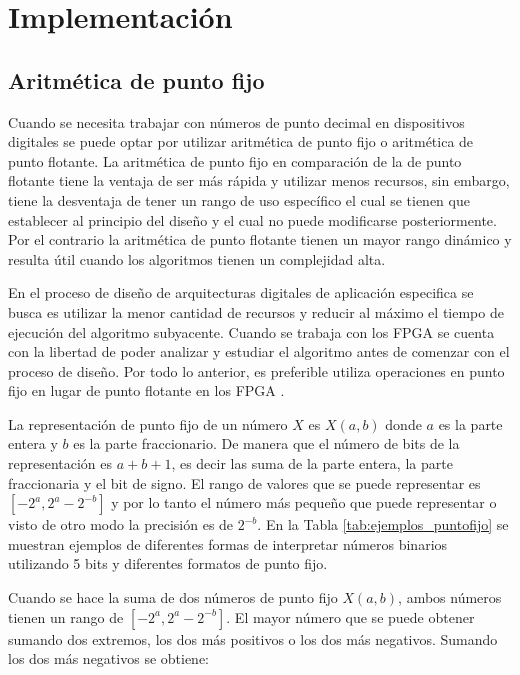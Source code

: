 \chapter{Implementación}

    \section{Aritmética de punto fijo}
        
        Cuando se necesita trabajar con números de punto decimal en dispositivos digitales se puede optar por utilizar aritmética de punto fijo o aritmética de punto flotante. La aritmética de punto fijo en comparación de la de punto flotante tiene la ventaja de ser más rápida y utilizar menos recursos, sin embargo, tiene la desventaja de tener un rango de uso específico el cual se tienen que establecer al principio del diseño y el cual no puede modificarse posteriormente. Por el contrario la aritmética de punto flotante tienen un mayor rango dinámico y resulta útil cuando los algoritmos tienen un complejidad alta. 

        En el proceso de diseño de arquitecturas digitales de aplicación especifica se busca es utilizar la menor cantidad de recursos y reducir al máximo el tiempo de ejecución del algoritmo subyacente. Cuando se trabaja con los FPGA se cuenta con la libertad de poder analizar y estudiar el algoritmo antes de comenzar con el proceso de diseño. Por todo lo anterior, es preferible utiliza operaciones en punto fijo en lugar de punto flotante en los FPGA \cite{TleloCuautle2016}.

        La representación de punto fijo de un número $X$ es $X(a,b)$ donde $a$ es la parte entera y $b$ es la parte fraccionario. De manera que el número de bits de la representación es $a+b+1$, es decir las suma de la parte entera, la parte fraccionaria y el bit de signo. El rango de valores que se puede representar es $[-2^{a}, 2^{a} - 2^{-b}]$ y por lo tanto el número más pequeño que puede representar o visto de otro modo la precisión es de $2^{-b}$. En la Tabla \ref{tab:ejemplos_puntofijo} se muestran ejemplos de diferentes formas de interpretar números binarios  utilizando 5 bits y diferentes formatos de punto fijo.
        
        Cuando se hace la suma de dos números de punto fijo $X(a,b)$, ambos números tienen un rango de $[-2^{a}, 2^{a} - 2^{-b}]$. El mayor número que se puede obtener sumando dos extremos, los dos más positivos o los dos más negativos. Sumando los dos más negativos se obtiene:

